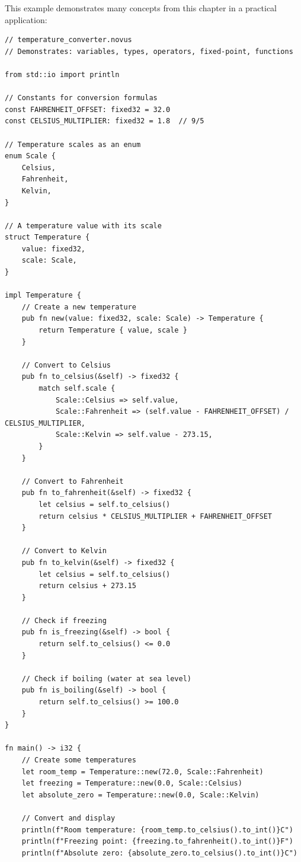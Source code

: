 This example demonstrates many concepts from this chapter in a practical application:

\begin{lstlisting}
// temperature_converter.novus
// Demonstrates: variables, types, operators, fixed-point, functions

from std::io import println

// Constants for conversion formulas
const FAHRENHEIT_OFFSET: fixed32 = 32.0
const CELSIUS_MULTIPLIER: fixed32 = 1.8  // 9/5

// Temperature scales as an enum
enum Scale {
    Celsius,
    Fahrenheit,
    Kelvin,
}

// A temperature value with its scale
struct Temperature {
    value: fixed32,
    scale: Scale,
}

impl Temperature {
    // Create a new temperature
    pub fn new(value: fixed32, scale: Scale) -> Temperature {
        return Temperature { value, scale }
    }

    // Convert to Celsius
    pub fn to_celsius(&self) -> fixed32 {
        match self.scale {
            Scale::Celsius => self.value,
            Scale::Fahrenheit => (self.value - FAHRENHEIT_OFFSET) / CELSIUS_MULTIPLIER,
            Scale::Kelvin => self.value - 273.15,
        }
    }

    // Convert to Fahrenheit
    pub fn to_fahrenheit(&self) -> fixed32 {
        let celsius = self.to_celsius()
        return celsius * CELSIUS_MULTIPLIER + FAHRENHEIT_OFFSET
    }

    // Convert to Kelvin
    pub fn to_kelvin(&self) -> fixed32 {
        let celsius = self.to_celsius()
        return celsius + 273.15
    }

    // Check if freezing
    pub fn is_freezing(&self) -> bool {
        return self.to_celsius() <= 0.0
    }

    // Check if boiling (water at sea level)
    pub fn is_boiling(&self) -> bool {
        return self.to_celsius() >= 100.0
    }
}

fn main() -> i32 {
    // Create some temperatures
    let room_temp = Temperature::new(72.0, Scale::Fahrenheit)
    let freezing = Temperature::new(0.0, Scale::Celsius)
    let absolute_zero = Temperature::new(0.0, Scale::Kelvin)

    // Convert and display
    println(f"Room temperature: {room_temp.to_celsius().to_int()}C")
    println(f"Freezing point: {freezing.to_fahrenheit().to_int()}F")
    println(f"Absolute zero: {absolute_zero.to_celsius().to_int()}C")


\end{lstlisting}
